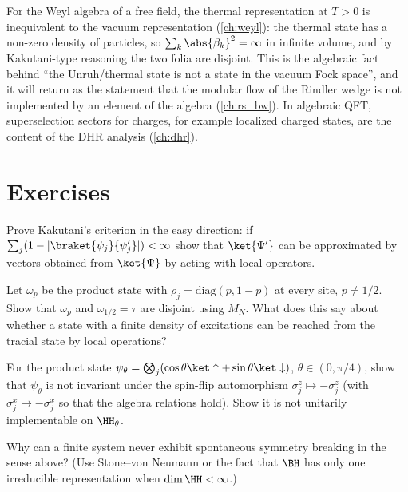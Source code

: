 For the Weyl algebra of a free field, the thermal representation at $T>0$ is inequivalent to the vacuum representation (\cref{ch:weyl}): the thermal state has a non-zero density of particles, so $\sum_k\abs{\beta_k}^2=\infty$ in infinite volume, and by Kakutani-type reasoning the two folia are disjoint. This is the algebraic fact behind ``the Unruh/thermal state is not a state in the vacuum Fock space'', and it will return as the statement that the modular flow of the Rindler wedge is not implemented by an element of the algebra (\cref{ch:rs_bw}). In algebraic QFT, superselection sectors for charges, for example localized charged states, are the content of the DHR analysis (\cref{ch:dhr}).

\section*{Exercises}
\begin{exercise}
Prove Kakutani's criterion in the easy direction: if $\sum_j(1-|\braket{\psi_j}{\psi_j'}|)<\infty$ show that $\ket{\Psi'}$ can be approximated by vectors obtained from $\ket{\Psi}$ by acting with local operators.
\end{exercise}
\begin{exercise}
Let $\omega_{p}$ be the product state with $\rho_j=\mathrm{diag}(p,1-p)$ at every site, $p\ne1/2$. Show that $\omega_p$ and $\omega_{1/2}=\tau$ are disjoint using $M_N$. What does this say about whether a state with a finite density of excitations can be reached from the tracial state by local operations?
\end{exercise}
\begin{exercise}
For the product state $\psi_\theta=\bigotimes_j(\cos\theta\ket\uparrow+\sin\theta\ket\downarrow)$, $\theta\in(0,\pi/4)$, show that $\psi_\theta$ is not invariant under the spin-flip automorphism $\sigma^z_j\mapsto-\sigma^z_j$ (with $\sigma^x_j\mapsto-\sigma^x_j$ so that the algebra relations hold). Show it is not unitarily implementable on $\HH_\theta$.
\end{exercise}
\begin{exercise}
Why can a finite system never exhibit spontaneous symmetry breaking in the sense above? (Use Stone--von Neumann or the fact that $\BH$ has only one irreducible representation when $\dim\HH<\infty$.)
\end{exercise}
